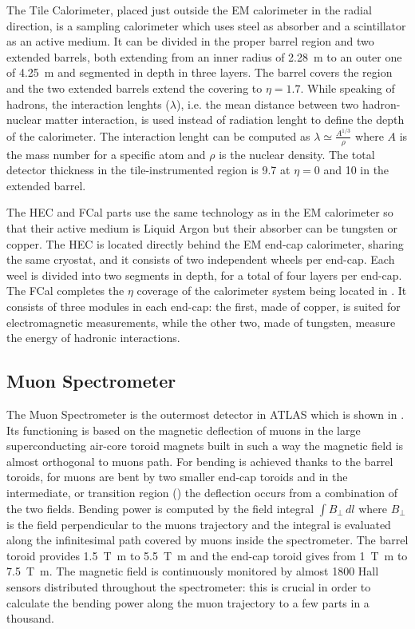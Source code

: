 The Tile Calorimeter, placed just outside the EM calorimeter in the radial direction, is a sampling calorimeter which uses steel as absorber and a scintillator as an active medium. It can be divided in the proper barrel region and two extended barrels, both extending from an inner radius of \SI{2.28}{\m} to an outer one of \SI{4.25}{\m} and segmented in depth in three layers. The barrel covers the region  and the two extended barrels extend the covering to $\eta=1.7$. While speaking of hadrons, the interaction lenghts ($\lambda$), i.e. the mean distance between two hadron-nuclear matter interaction, is used instead of radiation lenght to define the depth of the calorimeter. The interaction lenght can be computed as $\lambda \simeq \frac{A^{1/3}}{\rho}$ where $A$ is the mass number for a specific atom and $\rho$ is the nuclear density. The total detector thickness in the tile-instrumented region is \SI{9.7}{\lambda} at $\eta = 0$ and \SI{10}{\lambda} in the extended barrel.

The HEC and FCal parts use the same technology as in the EM calorimeter so that their active medium is Liquid Argon but their absorber can be tungsten or copper. The HEC is located directly behind the EM end-cap calorimeter, sharing the same cryostat, and it consists of two independent wheels per end-cap. Each weel is divided into two segments in depth, for a total of four layers per end-cap. The FCal completes the $\eta$ coverage of the calorimeter system being located in . It consists of three modules in each end-cap: the first, made of copper, is suited for electromagnetic measurements, while the other two, made of tungsten, measure the energy of hadronic interactions.

\subsection{Muon Spectrometer}
\label{sec:muons}
The Muon Spectrometer is the outermost detector in ATLAS which is shown in \Fig{\ref{fig:muons}}. Its functioning is based on the magnetic deflection of muons in the large superconducting air-core toroid magnets built in such a way the magnetic field is almost orthogonal to muons path. For  bending is achieved thanks to the barrel toroids, for  muons are bent by two smaller end-cap toroids and in the intermediate, or transition region () the deflection occurs from a combination of the two fields. Bending power is computed by the field integral $\int B_{\bot}\,dl$ where $B_{\bot}$ is the field perpendicular to the muons trajectory and the integral is evaluated along the infinitesimal path covered by muons inside the spectrometer. The barrel toroid provides \SI{1.5}{\tesla \metre} to \SI{5.5}{\tesla \metre} and the end-cap toroid gives from \SI{1}{\tesla \metre} to \SI{7.5}{\tesla \metre}. The magnetic field is continuously monitored by almost 1800 Hall sensors distributed throughout the spectrometer: this is crucial in order to calculate the bending power along the muon trajectory to a few parts in a thousand.

